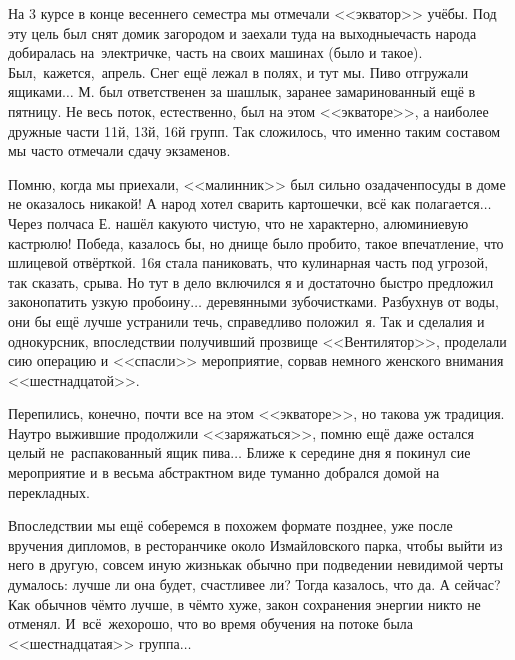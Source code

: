На 3 курсе в конце весеннего семестра мы отмечали <<экватор>> учёбы. Под эту цель был снят домик загородом и заехали туда на выходные\mdash часть народа добиралась на~электричке, часть на своих машинах (было и такое). Был,~кажется,~апрель. Снег ещё лежал в полях, и тут мы. Пиво отгружали ящиками$\ldots$ М. был ответственен за шашлык, заранее замаринованный ещё в пятницу. Не весь поток, естественно, был на этом <<экваторе>>, а наиболее дружные части 11\sdash й, 13\sdash й, 16\sdash й групп. Так сложилось, что именно таким составом мы часто отмечали сдачу экзаменов.

Помню, когда мы приехали, <<малинник>> был сильно озадачен\mdash посуды в доме не оказалось никакой! А народ хотел сварить картошечки, всё как полагается$\ldots$ Через полчаса Е. нашёл какую\sdash то чистую, что не характерно, алюминиевую кастрюлю! Победа, казалось бы, но днище было пробито, такое впечатление, что шлицевой отвёрткой. 16\sdash я стала паниковать, что кулинарная часть под угрозой, так сказать, срыва. Но тут в дело включился я и достаточно быстро предложил законопатить узкую пробоину$\ldots$ деревянными зубочистками. Разбухнув от воды, они бы ещё лучше устранили течь, справедливо положил~я. Так и сделали\mdash я и однокурсник, впоследствии получивший прозвище <<Вентилятор>>, проделали сию операцию и <<спасли>> мероприятие, сорвав немного женского внимания <<шестнадцатой>>.

Перепились, конечно, почти все на этом <<экваторе>>, но такова уж традиция. Наутро выжившие продолжили <<заряжаться>>, помню ещё даже остался целый не~распакованный ящик пива$\ldots$ Ближе к середине дня я покинул сие мероприятие и в весьма абстрактном виде туманно добрался домой на перекладных. 

Впоследствии мы ещё соберемся в похожем формате позднее, уже после вручения дипломов, в ресторанчике около Измайловского парка, чтобы выйти из него в другую, совсем иную жизнь\mdash как обычно при подведении невидимой черты думалось: лучше ли она будет, счастливее ли? Тогда казалось, что да. А сейчас? Как обычно\mdash в чём\sdash то лучше, в чём\sdash то хуже, закон сохранения энергии никто не отменял. И~всё~же\mdash хорошо, что во время обучения на потоке была <<шестнадцатая>> группа$\ldots$ %

\begin{center}
\end{center}